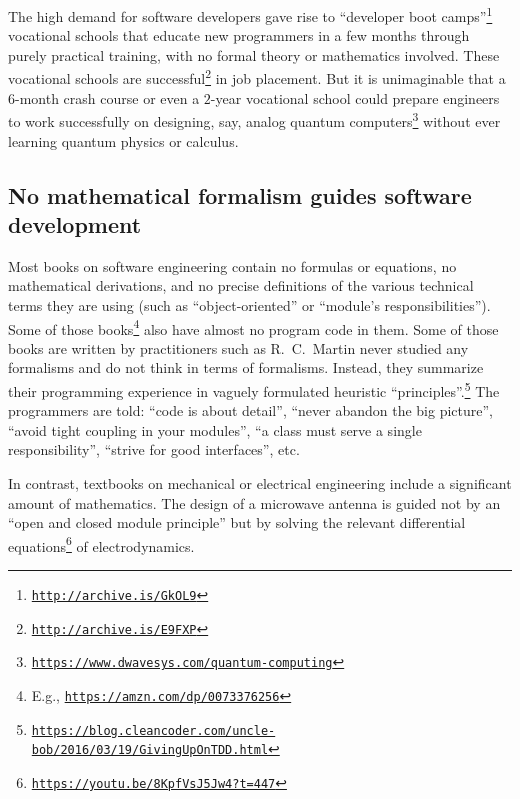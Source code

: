 The high demand for software developers gave rise to \textsf{``}developer
boot camps\textsf{''}\footnote{\texttt{\href{http://archive.is/GkOL9}{http://archive.is/GkOL9}}}
\textemdash{} vocational schools that educate new programmers in a
few months through purely practical training, with no formal theory
or mathematics involved. These vocational schools are successful\footnote{\texttt{\href{http://archive.is/E9FXP}{http://archive.is/E9FXP}}}
in job placement. But it is unimaginable that a $6$-month crash course
or even a $2$-year vocational school could prepare engineers to work
successfully on designing, say, analog quantum computers\footnote{\texttt{\href{https://www.dwavesys.com/quantum-computing}{https://www.dwavesys.com/quantum-computing}}}
without ever learning quantum physics or calculus.

\subsection*{No mathematical formalism guides software development}

Most books on software engineering contain no formulas or equations,
no mathematical derivations, and no precise definitions of the various
technical terms they are using (such as \textsf{``}object-oriented\textsf{''} or \textsf{``}module\textsf{'}s
responsibilities\textsf{''}). Some of those books\footnote{E.g., \texttt{\href{https://amzn.com/dp/0073376256}{https://amzn.com/dp/0073376256}}}
also have almost no program code in them. Some of those books are
written by practitioners such as R.\ C.\ Martin never studied any
formalisms and do not think in terms of formalisms. Instead, they
summarize their programming experience in vaguely formulated heuristic
\textquotedblleft principles\textquotedblright .\footnote{\texttt{\href{https://blog.cleancoder.com/uncle-bob/2016/03/19/GivingUpOnTDD.html}{https://blog.cleancoder.com/uncle-bob/2016/03/19/GivingUpOnTDD.html}}}
The programmers are told: \textsf{``}code is about detail\textsf{''}, \textsf{``}never abandon
the big picture\textsf{''}, \textsf{``}avoid tight coupling in your modules\textsf{''}, \textsf{``}a
class must serve a single responsibility\textsf{''}, \textsf{``}strive for good interfaces\textsf{''},
etc. 

In contrast, textbooks on mechanical or electrical engineering include
a significant amount of mathematics. The design of a microwave antenna
is guided not by an \textsf{``}open and closed module principle\textsf{''} but by
solving the relevant differential equations\footnote{\texttt{\href{https://youtu.be/8KpfVsJ5Jw4?t=447}{https://youtu.be/8KpfVsJ5Jw4?t=447}}}
of electrodynamics.

